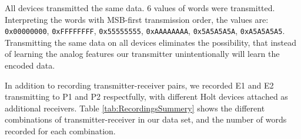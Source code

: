 \documentclass[conference]{IEEEtran}
\begin{document}
  All devices transmitted the same data. 6 values of words were transmitted. Interpreting the words with MSB-first transmission order, the values are: \texttt{0x00000000}, \texttt{0xFFFFFFFF}, \texttt{0x55555555}, \texttt{0xAAAAAAAA}, \texttt{0x5A5A5A5A}, \texttt{0xA5A5A5A5}. Transmitting the same data on all devices eliminates the possibility, that instead of learning the analog features our transmitter unintentionally will learn the encoded data.
  
  In addition to recording transmitter-receiver pairs, we recorded E1 and E2 transmitting to P1 and P2 respectfully, with different Holt devices attached as additional receivers. Table \ref{tab:RecordingsSummery} shows the different combinations of transmitter-receiver in our data set, and the number of words recorded for each combination.
  
\end{document}
